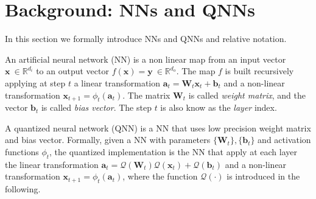 \section{Background: NNs and QNNs}\label{sec:background}

In this section we formally introduce NNs and QNNs and relative notation.

An artificial neural network (NN) is a non linear map from an input vector $\mathbf{x} \ \in \mathbb{R}^{d_i}$ to an output vector $f(\mathbf{x} ) = \mathbf{y} \ \in \mathbb{R}^{d_o}$. The map $f$ is built recursively applying at step $t$ a linear transformation $ \mathbf{a}_t = \mathbf{W}_t\mathbf{x}_t + \mathbf{b}_t$ and a non-linear transformation $\mathbf{x}_{t+1} = \phi_t(\mathbf{a}_t)$. The matrix $\mathbf{W}_t$ is called \emph{weight matrix}, and the vector $\mathbf{b}_t$ is called \emph{bias vector}. The step $t$ is also know as the \emph{layer} index. 

A quantized neural network (QNN) is a NN that uses low precision weight matrix and bias vector. Formally, given a NN with parameters $\{\mathbf{W}_t\}, \{\mathbf{b}_t\}$ and activation functions $\phi_t$, the quantized implementation is the NN that apply at each layer the linear transformation $\mathbf{a}_t = \mathcal{Q}(\mathbf{W}_t) \mathcal{Q}(\mathbf{x}_t) + \mathcal{Q}(\mathbf{b}_t)$ and a non-linear transformation $\mathbf{x}_{t+1} = \phi_t(\mathbf{a}_t)$, where the function $\mathcal{Q}(\cdot)$ is introduced in the following.


